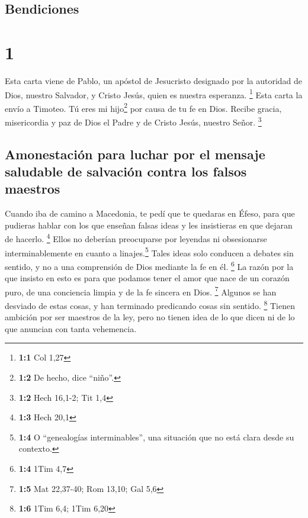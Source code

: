 \hypertarget{bendiciones}{%
\subsection{Bendiciones}\label{bendiciones}}

\hypertarget{section}{%
\section{1}\label{section}}

 Esta carta viene de Pablo, un apóstol de Jesucristo
designado por la autoridad de Dios, nuestro Salvador, y Cristo Jesús,
quien es nuestra esperanza. \footnote{\textbf{1:1} Col 1,27}
 Esta carta la envío a Timoteo. Tú eres mi hijo\footnote{\textbf{1:2}
  De hecho, dice ``niño''.} por causa de tu fe en Dios. Recibe gracia,
misericordia y paz de Dios el Padre y de Cristo Jesús, nuestro Señor.
\footnote{\textbf{1:2} Hech 16,1-2; Tit 1,4}

\hypertarget{amonestaciuxf3n-para-luchar-por-el-mensaje-saludable-de-salvaciuxf3n-contra-los-falsos-maestros}{%
\subsection{Amonestación para luchar por el mensaje saludable de
salvación contra los falsos
maestros}\label{amonestaciuxf3n-para-luchar-por-el-mensaje-saludable-de-salvaciuxf3n-contra-los-falsos-maestros}}

 Cuando iba de camino a Macedonia, te pedí que te quedaras
en Éfeso, para que pudieras hablar con los que enseñan falsas ideas y
les insistieras en que dejaran de hacerlo. \footnote{\textbf{1:3} Hech
  20,1}  Ellos no deberían preocuparse por leyendas ni
obsesionarse interminablemente en cuanto a linajes.\footnote{\textbf{1:4}
  O ``genealogías interminables'', una situación que no está clara desde
  su contexto.} Tales ideas solo conducen a debates sin sentido, y no a
una comprensión de Dios mediante la fe en él. \footnote{\textbf{1:4}
  1Tim 4,7}  La razón por la que insisto en esto es para
que podamos tener el amor que nace de un corazón puro, de una conciencia
limpia y de la fe sincera en Dios. \footnote{\textbf{1:5} Mat 22,37-40;
  Rom 13,10; Gal 5,6}  Algunos se han desviado de estas
cosas, y han terminado predicando cosas sin sentido. \footnote{\textbf{1:6}
  1Tim 6,4; 1Tim 6,20}  Tienen ambición por ser maestros
de la ley, pero no tienen idea de lo que dicen ni de lo que anuncian con
tanta vehemencia.

